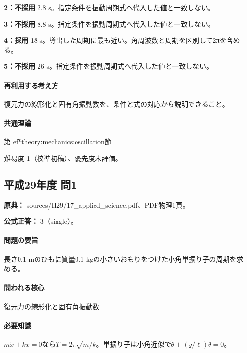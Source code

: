 \noindent\textbf{2：不採用} 2.8 s。指定条件を振動周期式へ代入した値と一致しない。\par

\noindent\textbf{3：不採用} 8.8 s。指定条件を振動周期式へ代入した値と一致しない。\par

\noindent\textbf{4：採用} 18 s。導出した周期に最も近い。角周波数と周期を区別して2πを含める。\par

\noindent\textbf{5：不採用} 26 s。指定条件を振動周期式へ代入した値と一致しない。\par

\paragraph{再利用する考え方} 復元力の線形化と固有角振動数を、条件と式の対応から説明できること。

\paragraph{共通理論} \hyperref[theory:mechanics:oscillation]{第
ef*{theory:mechanics:oscillation}節}

\par 難易度 1（校準初稿）、優先度未評価。

\subsection{平成29年度 問1}
\label{q:h29-reg-applied-01}

\noindent\textbf{原典：} sources/H29/17\_applied\_science.pdf、PDF物理1頁。

\textbf{公式正答：} 3（single）。

\paragraph{問題の要旨} 長さ0.1 mのひもに質量0.1 kgの小さいおもりをつけた小角単振り子の周期を求める。

\paragraph{問われる核心} 復元力の線形化と固有角振動数

\paragraph{必要知識} \(m\ddot x+kx=0\)なら\(T=2\pi\sqrt{m/k}\)。単振り子は小角近似で\(\ddot\theta+(g/\ell)\theta=0\)。

